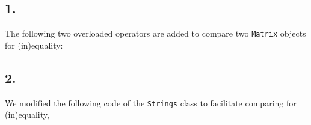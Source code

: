 \documentclass[12pt]{article}
\begin{document}
\subsection*{1.}
The following two overloaded operators are added to compare two \texttt{Matrix} objects for (in)equality:


\subsection*{2.}
We modified the following code of the \texttt{Strings} class to facilitate comparing for (in)equality,





\clearpage
\end{document}
